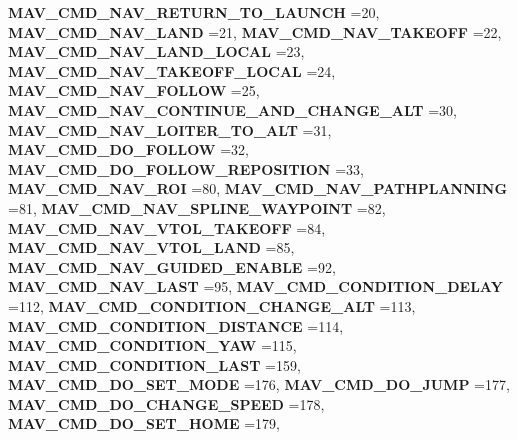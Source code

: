 \begin{DoxyCompactItemize}
\textbf{ M\+A\+V\+\_\+\+C\+M\+D\+\_\+\+N\+A\+V\+\_\+\+R\+E\+T\+U\+R\+N\+\_\+\+T\+O\+\_\+\+L\+A\+U\+N\+CH} =20, 
\textbf{ M\+A\+V\+\_\+\+C\+M\+D\+\_\+\+N\+A\+V\+\_\+\+L\+A\+ND} =21, 
\textbf{ M\+A\+V\+\_\+\+C\+M\+D\+\_\+\+N\+A\+V\+\_\+\+T\+A\+K\+E\+O\+FF} =22, 
\textbf{ M\+A\+V\+\_\+\+C\+M\+D\+\_\+\+N\+A\+V\+\_\+\+L\+A\+N\+D\+\_\+\+L\+O\+C\+AL} =23, 
\newline
\textbf{ M\+A\+V\+\_\+\+C\+M\+D\+\_\+\+N\+A\+V\+\_\+\+T\+A\+K\+E\+O\+F\+F\+\_\+\+L\+O\+C\+AL} =24, 
\textbf{ M\+A\+V\+\_\+\+C\+M\+D\+\_\+\+N\+A\+V\+\_\+\+F\+O\+L\+L\+OW} =25, 
\textbf{ M\+A\+V\+\_\+\+C\+M\+D\+\_\+\+N\+A\+V\+\_\+\+C\+O\+N\+T\+I\+N\+U\+E\+\_\+\+A\+N\+D\+\_\+\+C\+H\+A\+N\+G\+E\+\_\+\+A\+LT} =30, 
\textbf{ M\+A\+V\+\_\+\+C\+M\+D\+\_\+\+N\+A\+V\+\_\+\+L\+O\+I\+T\+E\+R\+\_\+\+T\+O\+\_\+\+A\+LT} =31, 
\newline
\textbf{ M\+A\+V\+\_\+\+C\+M\+D\+\_\+\+D\+O\+\_\+\+F\+O\+L\+L\+OW} =32, 
\textbf{ M\+A\+V\+\_\+\+C\+M\+D\+\_\+\+D\+O\+\_\+\+F\+O\+L\+L\+O\+W\+\_\+\+R\+E\+P\+O\+S\+I\+T\+I\+ON} =33, 
\textbf{ M\+A\+V\+\_\+\+C\+M\+D\+\_\+\+N\+A\+V\+\_\+\+R\+OI} =80, 
\textbf{ M\+A\+V\+\_\+\+C\+M\+D\+\_\+\+N\+A\+V\+\_\+\+P\+A\+T\+H\+P\+L\+A\+N\+N\+I\+NG} =81, 
\newline
\textbf{ M\+A\+V\+\_\+\+C\+M\+D\+\_\+\+N\+A\+V\+\_\+\+S\+P\+L\+I\+N\+E\+\_\+\+W\+A\+Y\+P\+O\+I\+NT} =82, 
\textbf{ M\+A\+V\+\_\+\+C\+M\+D\+\_\+\+N\+A\+V\+\_\+\+V\+T\+O\+L\+\_\+\+T\+A\+K\+E\+O\+FF} =84, 
\textbf{ M\+A\+V\+\_\+\+C\+M\+D\+\_\+\+N\+A\+V\+\_\+\+V\+T\+O\+L\+\_\+\+L\+A\+ND} =85, 
\textbf{ M\+A\+V\+\_\+\+C\+M\+D\+\_\+\+N\+A\+V\+\_\+\+G\+U\+I\+D\+E\+D\+\_\+\+E\+N\+A\+B\+LE} =92, 
\newline
\textbf{ M\+A\+V\+\_\+\+C\+M\+D\+\_\+\+N\+A\+V\+\_\+\+L\+A\+ST} =95, 
\textbf{ M\+A\+V\+\_\+\+C\+M\+D\+\_\+\+C\+O\+N\+D\+I\+T\+I\+O\+N\+\_\+\+D\+E\+L\+AY} =112, 
\textbf{ M\+A\+V\+\_\+\+C\+M\+D\+\_\+\+C\+O\+N\+D\+I\+T\+I\+O\+N\+\_\+\+C\+H\+A\+N\+G\+E\+\_\+\+A\+LT} =113, 
\textbf{ M\+A\+V\+\_\+\+C\+M\+D\+\_\+\+C\+O\+N\+D\+I\+T\+I\+O\+N\+\_\+\+D\+I\+S\+T\+A\+N\+CE} =114, 
\newline
\textbf{ M\+A\+V\+\_\+\+C\+M\+D\+\_\+\+C\+O\+N\+D\+I\+T\+I\+O\+N\+\_\+\+Y\+AW} =115, 
\textbf{ M\+A\+V\+\_\+\+C\+M\+D\+\_\+\+C\+O\+N\+D\+I\+T\+I\+O\+N\+\_\+\+L\+A\+ST} =159, 
\textbf{ M\+A\+V\+\_\+\+C\+M\+D\+\_\+\+D\+O\+\_\+\+S\+E\+T\+\_\+\+M\+O\+DE} =176, 
\textbf{ M\+A\+V\+\_\+\+C\+M\+D\+\_\+\+D\+O\+\_\+\+J\+U\+MP} =177, 
\newline
\textbf{ M\+A\+V\+\_\+\+C\+M\+D\+\_\+\+D\+O\+\_\+\+C\+H\+A\+N\+G\+E\+\_\+\+S\+P\+E\+ED} =178, 
\textbf{ M\+A\+V\+\_\+\+C\+M\+D\+\_\+\+D\+O\+\_\+\+S\+E\+T\+\_\+\+H\+O\+ME} =179, 

\end{DoxyCompactItemize}
